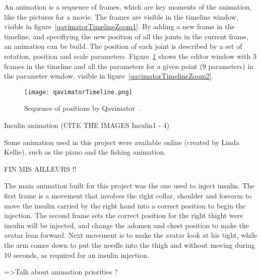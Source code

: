An animation is a sequence of frames, which are key moments of the animation, like the pictures for a movie. The frames are visible in the timeline window, visible in figure~\ref{qavimatorTimelineZoom1}.
By adding a new frame in the timeline, and specifiying the new position of all the joints in the current frame, an animation can be build. The position of each joint is described by a set of rotation, position and scale parameters. Figure~\ref{qavimatorTimeline} shows the editor window with 3 frames in the timeline and all the parameters for a given point (9 parameters) in the parameter window, visible in figure~\ref{qavimatorTimelineZoom2}.

\begin{figure}[h]
  \caption{Sequence of positions by Qavimator~\cite{qavimatorWebsite}. }
  \centering
  \texttt{[image: qavimatorTimeline.png]}
  \label{qavimatorTimeline}
\end{figure}

Insulin animation (CITE THE IMAGES Insulin1 - 4)

Some animation used in this project were available online (created by Linda Kellie), such as the piano and the fishing animation.

FIN MIS AILLEURS !!
\fi

The main animation built for this project was the one used to inject insulin. The first frame is a movement that involves the right collar, shoulder and forearm to move the insulin carried by the right hand into a correct position to begin the injection. The second frame sets the correct position for the right thight were insulin will be injected, and change the adomen and chest position to make the avatar lean forward. Next movement is to make the avatar look at his tight, while the arm comes down to put the needle into the thigh and without moving during 10 seconds, as required for an insulin injection.

=>Talk about animation priorities ? 

